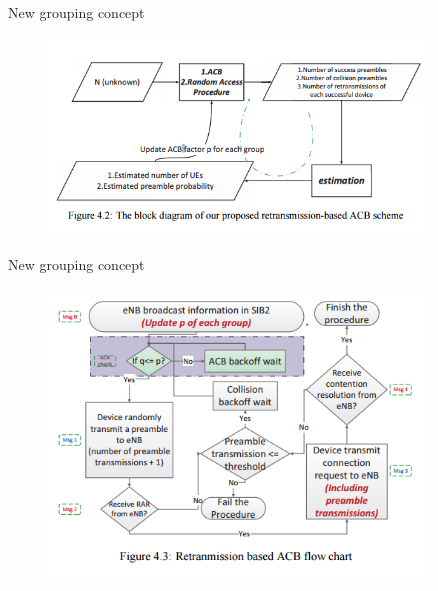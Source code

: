 \documentclass{beamer}
\begin{document}
\begin{frame}{New grouping concept}
    \begin{figure}[t]
        \centering
        \includegraphics[width=0.9\textwidth]{figures/4_2.png}
    \end{figure}
\end{frame}
\begin{frame}{New grouping concept}
    \begin{figure}[t]
        \centering
        \includegraphics[width=0.9\textwidth]{figures/4_3.png}
    \end{figure}
\end{frame}
\end{document}
